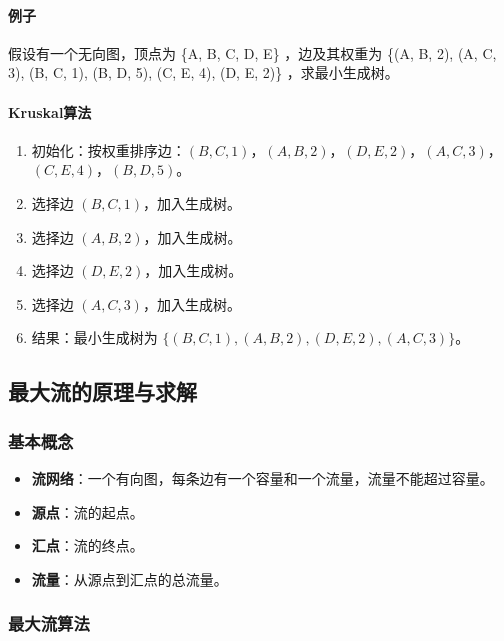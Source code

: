 \documentclass[UTF8]{ctexart}
\begin{document}
\paragraph{例子}
假设有一个无向图，顶点为 \{A, B, C, D, E\} ，边及其权重为 \{(A, B, 2), (A, C, 3), (B, C, 1), (B, D, 5), (C, E, 4), (D, E, 2)\} ，求最小生成树。

\paragraph{Kruskal算法}
\begin{enumerate}
    \item 初始化：按权重排序边：\( (B, C, 1) \)，\( (A, B, 2) \)，\( (D, E, 2) \)，\( (A, C, 3) \)，\( (C, E, 4) \)，\( (B, D, 5) \)。
    \item 选择边 \( (B, C, 1) \)，加入生成树。
    \item 选择边 \( (A, B, 2) \)，加入生成树。
    \item 选择边 \( (D, E, 2) \)，加入生成树。
    \item 选择边 \( (A, C, 3) \)，加入生成树。
    \item 结果：最小生成树为 \( \{(B, C, 1), (A, B, 2), (D, E, 2), (A, C, 3)\} \)。
\end{enumerate}

\subsection {最大流的原理与求解}
\subsubsection {基本概念}
\begin{itemize}
    \item \textbf{流网络}：一个有向图，每条边有一个容量和一个流量，流量不能超过容量。
    \item \textbf{源点}：流的起点。
    \item \textbf{汇点}：流的终点。
    \item \textbf{流量}：从源点到汇点的总流量。
\end{itemize}

\subsubsection {最大流算法}
\end{document}
